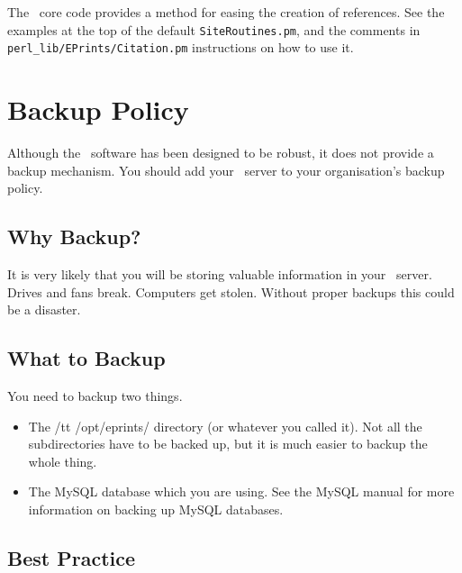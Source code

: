 The \eprints\ core code provides a method for easing the creation of references. See the examples at the top of the default {\tt SiteRoutines.pm}, and the comments in {\tt perl\_lib/EPrints/Citation.pm} instructions on how to use it.

\section{Backup Policy}

Although the \eprints\ software has been designed to be robust, it does not
provide a backup mechanism. You should add your \eprints\ server to your organisation's backup policy. 

\subsection{Why Backup?}

It is very likely that you will be storing 
valuable information in your \eprints\ server.
Drives and fans break. Computers get
stolen. Without proper backups this could be a disaster.

\subsection{What to Backup}

You need to backup two things. 
\begin{itemize}
\item The {/tt /opt/eprints/} directory (or whatever you called it). Not all the subdirectories have to be backed up, but it is much easier to backup the whole thing.
\item The MySQL database which you are using. See the MySQL manual for more information on backing up MySQL databases.
\end{itemize}


\subsection{Best Practice}


